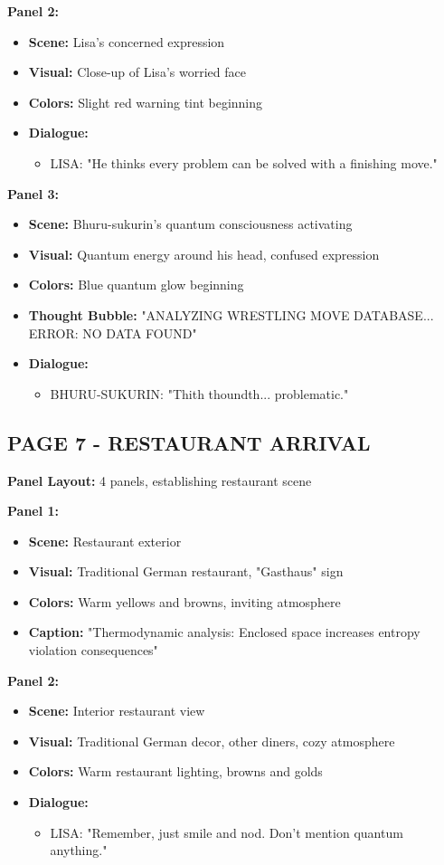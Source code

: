 \documentclass[12pt,a4paper]{article}
\begin{document}
\textbf{Panel 2:}
\begin{itemize}
\item \textbf{Scene:} Lisa's concerned expression
\item \textbf{Visual:} Close-up of Lisa's worried face
\item \textbf{Colors:} Slight red warning tint beginning
\item \textbf{Dialogue:}
\begin{itemize}
\item LISA: "He thinks every problem can be solved with a finishing move."
\end{itemize}
\end{itemize}

\textbf{Panel 3:}
\begin{itemize}
\item \textbf{Scene:} Bhuru-sukurin's quantum consciousness activating
\item \textbf{Visual:} Quantum energy around his head, confused expression
\item \textbf{Colors:} Blue quantum glow beginning
\item \textbf{Thought Bubble:} "ANALYZING WRESTLING MOVE DATABASE... ERROR: NO DATA FOUND"
\item \textbf{Dialogue:}
\begin{itemize}
\item BHURU-SUKURIN: "Thith thoundth... problematic."
\end{itemize}
\end{itemize}

\subsection{PAGE 7 - RESTAURANT ARRIVAL}

\textbf{Panel Layout:} 4 panels, establishing restaurant scene

\textbf{Panel 1:}
\begin{itemize}
\item \textbf{Scene:} Restaurant exterior
\item \textbf{Visual:} Traditional German restaurant, "Gasthaus" sign
\item \textbf{Colors:} Warm yellows and browns, inviting atmosphere
\item \textbf{Caption:} "Thermodynamic analysis: Enclosed space increases entropy violation consequences"
\end{itemize}

\textbf{Panel 2:}
\begin{itemize}
\item \textbf{Scene:} Interior restaurant view
\item \textbf{Visual:} Traditional German decor, other diners, cozy atmosphere
\item \textbf{Colors:} Warm restaurant lighting, browns and golds
\item \textbf{Dialogue:}
\begin{itemize}
\item LISA: "Remember, just smile and nod. Don't mention quantum anything."
\end{itemize}
\end{itemize}
\end{document}
